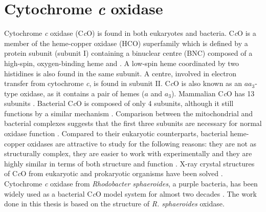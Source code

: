 \section{Cytochrome \emph{c} oxidase}

Cytochrome \emph{c} oxidase (C\emph{c}O) is found in both eukaryotes and bacteria. C\emph{c}O is a member of the heme-copper oxidase (HCO) superfamily which is defined by a protein subunit (subunit I) containing a binuclear centre (BNC) composed of a high-spin, oxygen-binding heme and . A low-spin heme coordinated by two histidines is also found in the same subunit. A  centre, involved in electron transfer from cytochrome \emph{c}, is found in subunit II. C\emph{c}O is also known as an $aa_3$-type oxidase, as it contains a pair of hemes ($a$ and $a_3$). Mammalian C\emph{c}O has 13 subunits \cite{Capaldi:1990p10284,Shimokata:2007p10305}. Bacterial C\emph{c}O is composed of only 4 subunits, although it still functions by a similar mechanism \cite{Hosler:1992p6662,Pfitzner:1998p10266}. Comparison between the mitochondrial and bacterial complexes suggests that the first three subunits are necessary for normal oxidase function \cite{Capaldi:1990p10284}. Compared to their eukaryotic counterparts, bacterial heme-copper oxidases are attractive to study for the following reasons: they are not as structurally complex, they are easier to work with experimentally and they are highly similar in terms of both structure and function \cite{Pfitzner:1998p10266}. X-ray crystal structures of C\emph{c}O from eukaryotic and prokaryotic organisms have been solved \cite{Yoshikawa:1988p6660,Iwata:1995p10222,Tsukihara:1995p8115,Tsukihara:1996p10224,SvenssonEk:2002p5595,Qin:2006p7708,ShinzawaItoh:2007p5268,Muramoto:2007p8383,Qin:2008p7672,Durr:2008p6162,Qin:2009p5745,Aoyama:2009p10495,Koepke:2009p10494,Muramoto:2010p10493,Liu:2011p9691}. Cytochrome \emph{c} oxidase from \emph{Rhodobacter sphaeroides}, a purple bacteria, has been widely used as a bacterial C\emph{c}O model system for almost two decades \cite{Hosler:1992p6662}. The work done in this thesis is based on the structure of \emph{R. sphaeroides} oxidase.

